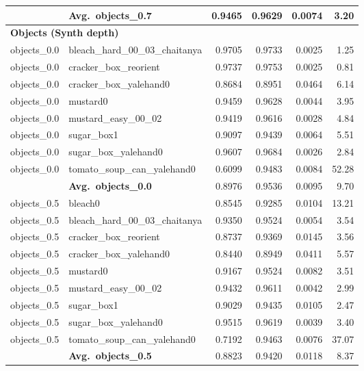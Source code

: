 \begin{longtable}{llrrrr}
  \cmidrule{2-6}
  & \textbf{Avg.~objects_0.7} & 0.9465 & 0.9629 & 0.0074 & 3.20 \\
  \midrule
\multicolumn{6}{l}{\textbf{Objects (Synth depth)}} \\
\midrule
  objects_0.0 & bleach\_hard\_00\_03\_chaitanya & 0.9705 & 0.9733 & 0.0025 & 1.25 \\
  objects_0.0 & cracker\_box\_reorient & 0.9737 & 0.9753 & 0.0025 & 0.81 \\
  objects_0.0 & cracker\_box\_yalehand0 & 0.8684 & 0.8951 & 0.0464 & 6.14 \\
  objects_0.0 & mustard0 & 0.9459 & 0.9628 & 0.0044 & 3.95 \\
  objects_0.0 & mustard\_easy\_00\_02 & 0.9419 & 0.9616 & 0.0028 & 4.84 \\
  objects_0.0 & sugar\_box1 & 0.9097 & 0.9439 & 0.0064 & 5.51 \\
  objects_0.0 & sugar\_box\_yalehand0 & 0.9607 & 0.9684 & 0.0026 & 2.84 \\
  objects_0.0 & tomato\_soup\_can\_yalehand0 & 0.6099 & 0.9483 & 0.0084 & 52.28 \\
  \cmidrule{2-6}
  & \textbf{Avg.~objects_0.0} & 0.8976 & 0.9536 & 0.0095 & 9.70 \\
  \midrule
  objects_0.5 & bleach0 & 0.8545 & 0.9285 & 0.0104 & 13.21 \\
  objects_0.5 & bleach\_hard\_00\_03\_chaitanya & 0.9350 & 0.9524 & 0.0054 & 3.54 \\
  objects_0.5 & cracker\_box\_reorient & 0.8737 & 0.9369 & 0.0145 & 3.56 \\
  objects_0.5 & cracker\_box\_yalehand0 & 0.8440 & 0.8949 & 0.0411 & 5.57 \\
  objects_0.5 & mustard0 & 0.9167 & 0.9524 & 0.0082 & 3.51 \\
  objects_0.5 & mustard\_easy\_00\_02 & 0.9432 & 0.9611 & 0.0042 & 2.99 \\
  objects_0.5 & sugar\_box1 & 0.9029 & 0.9435 & 0.0105 & 2.47 \\
  objects_0.5 & sugar\_box\_yalehand0 & 0.9515 & 0.9619 & 0.0039 & 3.40 \\
  objects_0.5 & tomato\_soup\_can\_yalehand0 & 0.7192 & 0.9463 & 0.0076 & 37.07 \\
  \cmidrule{2-6}
  & \textbf{Avg.~objects_0.5} & 0.8823 & 0.9420 & 0.0118 & 8.37 \\
  \midrule
\bottomrule
\end{longtable}
